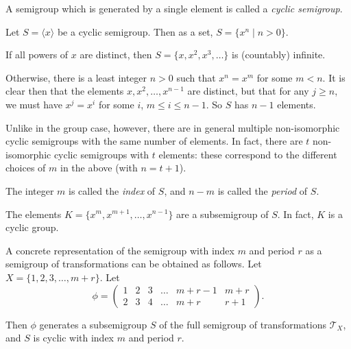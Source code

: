 \documentclass[12pt]{article}
\begin{document}
A semigroup which is generated by a single element is called a \emph{cyclic semigroup}.

Let $S = \langle x \rangle$ be a cyclic semigroup.  Then as a set, $S = \{ x^n \mid n > 0\}$.

If all powers of $x$ are distinct, then $S = \{x, x^2, x^3, \dotsc \}$ is (countably) infinite.

Otherwise, there is a least integer $n > 0$ such that $x^n = x^m$ for some $m < n$.  It is clear then that the elements $x, x^2, \dots, x^{n-1}$ are distinct, but that for any $j \ge n$, we must have $x^j = x^i$ for some $i$, $m \le i \le n-1$.  So $S$ has $n-1$ elements.

Unlike in the group case, however, there are in general multiple non-isomorphic cyclic semigroups with the same number of elements.  In fact, there are $t$ non-isomorphic cyclic semigroups with $t$ elements:  these correspond to the different choices of $m$ in the above (with $n = t+1$).

The integer $m$ is called the \emph{index} of $S$, and $n-m$ is called the \emph{period} of $S$.

The elements $K = \{x^m, x^{m+1}, \dots, x^{n-1}\}$ are a subsemigroup of $S$.  In fact, $K$ is a cyclic group.

A concrete representation of the semigroup with index $m$ and period $r$ as a semigroup of transformations can be obtained as follows.  Let $X = \{1, 2, 3, \dots, m + r\}$.  Let
$$
\phi =
\begin{pmatrix}
1 & 2 & 3 & \dots & m+r-1 & m+r \\
2 & 3 & 4 & \dots & m+r & r+1
\end{pmatrix}.
$$

Then $\phi$ generates a subsemigroup $S$ of the full semigroup of transformations $\mathcal{T}_X$, and $S$ is cyclic with index $m$ and period $r$.
\end{document}

